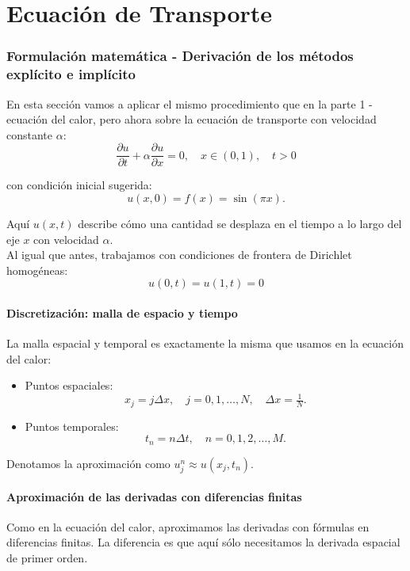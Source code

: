 \documentclass[12pt,a4paper]{article}
\begin{document}
\newpage

\part{Ecuación de Transporte}

\section{Formulación matemática - Derivación de los métodos explícito e implícito}

En esta sección vamos a aplicar el mismo procedimiento que en la parte 1 - ecuación del calor, pero ahora sobre la ecuación de transporte con velocidad constante $\alpha$:
\[
\frac{\partial u}{\partial t} + \alpha \frac{\partial u}{\partial x} = 0,
\quad x \in (0,1), \quad t > 0
\]

con condición inicial sugerida:
\[
u(x,0) = f(x) = \sin(\pi x).
\]

Aquí $u(x,t)$ describe cómo una cantidad se desplaza en el tiempo a lo largo del eje $x$ con velocidad $\alpha$. \\

Al igual que antes, trabajamos con condiciones de frontera de Dirichlet homogéneas:
\[
u(0,t)=u(1,t)=0
\]

\subsection{Discretización: malla de espacio y tiempo}

La malla espacial y temporal es exactamente la misma que usamos en la ecuación del calor:

\begin{itemize}
    \item Puntos espaciales:
    \[
    x_j = j \Delta x, \quad j = 0,1,\dots,N, \quad \Delta x = \tfrac{1}{N}.
    \]

    \item Puntos temporales:
    \[
    t_n = n\Delta t, \quad n = 0,1,2,\dots,M.
    \]
\end{itemize}

Denotamos la aproximación como $u_j^n \approx u(x_j,t_n)$.

\subsection{Aproximación de las derivadas con diferencias finitas}

Como en la ecuación del calor, aproximamos las derivadas con fórmulas en diferencias finitas.  
La diferencia es que aquí sólo necesitamos la derivada espacial de primer orden.
\end{document}
